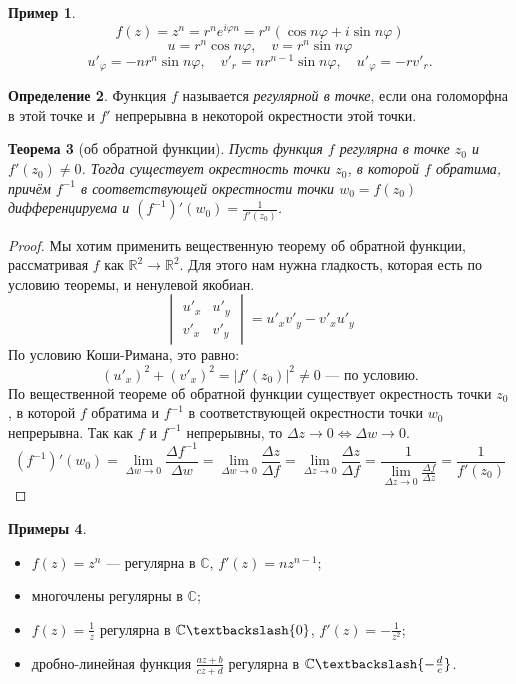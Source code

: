 \documentclass[11pt,openany,a4paper]{scrartcl}
\theoremstyle{plain}
\newtheorem{theorem}{Теорема}[section]
\theoremstyle{definition}
\newtheorem{definition}[theorem]{Определение}
\newtheorem{example}[theorem]{Пример}
\newtheorem{examples}[theorem]{Примеры}
\newcommand\mb{\mathbb}
\newcommand\real{\mb R}
\newcommand{\complex}{\mb C}
\begin{document}
\begin{example}
	$$
	f(z) = z^n = r^ne^{i\varphi n} = r^n(\cos n\varphi + i\sin n\varphi)
	$$
	$$
	u = r^n\cos n\varphi,\quad v = r^n\sin n\varphi
	$$
	$$
	u'_\varphi = -nr^n\sin n\varphi,\quad v'_r = nr^{n-1}\sin n\varphi,\quad u'_\varphi = -rv'_r.
	$$
\end{example}
\begin{definition}
	Функция $f$ называется \emph{регулярной в точке}, если она голоморфна в этой точке и $f'$ непрерывна в некоторой
	окрестности этой точки.
\end{definition}
\begin{theorem}[об обратной функции]
	Пусть функция $f$ регулярна в точке $z_0$ и $f'(z_0) \neq 0$. Тогда существует окрестность точки $z_0$, в которой
	$f$ обратима, причём $f^{-1}$ в соответствующей окрестности точки $w_0 = f(z_0)$ дифференцируема и
	$(f^{-1})'(w_0) = \frac{1}{f'(z_0)}$.
\end{theorem}
\begin{proof}
	Мы хотим применить вещественную теорему об обратной функции, рассматривая $f$ как $\real^2 \to \real^2$. Для этого
	нам нужна гладкость, которая есть по условию теоремы, и ненулевой якобиан.
	$$
	\begin{vmatrix}
		u'_x & u'_y\\
		v'_x & v'_y
	\end{vmatrix} =
	u'_xv'_y - v'_xu'_y
	$$
	По условию Коши-Римана, это равно:
	$$
	(u'_x)^2 + (v'_x)^2 = |f'(z_0)|^2 \neq 0\text{ — по условию.}
	$$
	По вещественной теореме об обратной функции существует окрестность точки $z_0$, в которой $f$ обратима и $f^{-1}$ в
	соответствующей окрестности точки $w_0$ непрерывна. Так как $f$ и $f^{-1}$ непрерывны, то
	$\Delta z \to 0 \iff \Delta w \to 0$.
	$$
	(f^{-1})'(w_0) = \lim_{\Delta w \to 0}\frac{\Delta f^{-1}}{\Delta w} = \lim_{\Delta w \to 0}
	\frac{\Delta z}{\Delta f} = \lim_{\Delta z \to 0}\frac{\Delta z}{\Delta f} =
	\frac{1}{\lim\limits_{\Delta z \to 0}\frac{\Delta f}{\Delta z}} = \frac{1}{f'(z_0)}
	$$
\end{proof}
\begin{examples}
	\begin{itemize}
		\item $f(z) = z^n$ — регулярна в $\complex$, $f'(z) = nz^{n-1}$;
		\item многочлены регулярны в $\complex$;
		\item $f(z) = \frac{1}{z}$ регулярна в $\complex\textbackslash \{0\}$, $f'(z) = -\frac{1}{z^2}$;
		\item дробно-линейная функция $\frac{az + b}{cz + d}$ регулярна в $\complex \textbackslash
		\{-\frac{d}{c}\}$.
	\end{itemize}
\end{examples}
\end{document}
